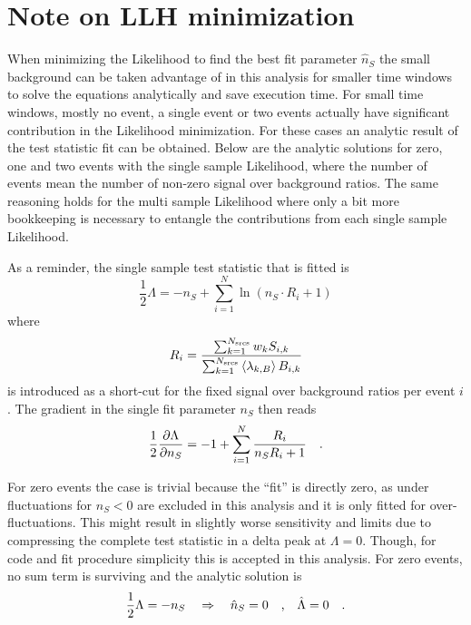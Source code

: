 \section{Note on LLH minimization}
When minimizing the Likelihood to find the best fit parameter $\hat{n}_S$ the small background can be taken advantage of in this analysis for smaller time windows to solve the equations analytically and save execution time.
For small time windows, mostly no event, a single event or two events actually have significant contribution in the Likelihood minimization.
For these cases an analytic result of the test statistic fit can be obtained.
Below are the analytic solutions for zero, one and two events with the single sample Likelihood, where the number of events mean the number of non-zero signal over background ratios.
The same reasoning holds for the multi sample Likelihood where only a bit more bookkeeping is necessary to entangle the contributions from each single sample Likelihood.

As a reminder, the single sample test statistic that is fitted is
\begin{equation}
  \frac{1}{2}\Lambda = -n_S + \sum_{i=1}^N \ln\left(n_S \cdot R_i + 1\right)
\end{equation}
where
\begin{equation}
  R_i = \frac{\sum_{k=1}^{N_\text{srcs}} w_k S_{i,k}}
             {\sum_{k=1}^{N_\text{srcs}}\Braket{\lambda_{k,B}} B_{i,k}}
\end{equation}
is introduced as a short-cut for the fixed signal over background ratios per event $i$.
The gradient in the single fit parameter $n_S$ then reads
\begin{equation}
  \frac{1}{2}\frac{\partial \Lambda}{\partial n_S}
  = -1 + \sum_{i=1}^N \frac{R_i}{n_S R_i + 1}
  \quad\text{.}
\end{equation}

For zero events the case is trivial because the \enquote{fit} is directly zero, as under fluctuations for $n_S < 0$ are excluded in this analysis and it is only fitted for over-fluctuations.
This might result in slightly worse sensitivity and limits due to compressing the complete test statistic in a delta peak at $\Lambda=0$.
Though, for code and fit procedure simplicity this is accepted in this analysis. 
For zero events, no sum term is surviving and the analytic solution is
\begin{equation}
  \frac{1}{2}\Lambda
  = -n_S \quad\Rightarrow\quad \hat{n}_S = 0\quad\text{,}\quad \hat{\Lambda} = 0
  \quad\text{.}
\end{equation}

